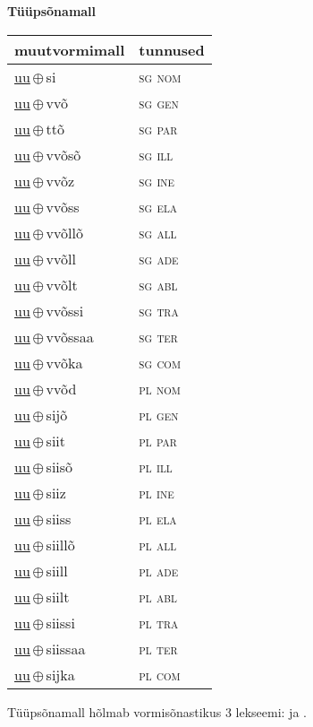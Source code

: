 

\vspace{3.5em}
\noindent \begin{minipage}{\textwidth}
\noindent \textbf{Tüüpsõnamall \,}\\

\begin{sideways}
\begin{tabular}{l l}
muutvormimall & tunnused \\
\hline
\underline{uu}\,$\oplus$\,si & \textsc{ sg nom } \\
\underline{uu}\,$\oplus$\,vvõ & \textsc{ sg gen } \\
\underline{uu}\,$\oplus$\,ttõ & \textsc{ sg par } \\
\underline{uu}\,$\oplus$\,vvõsõ & \textsc{ sg ill } \\
\underline{uu}\,$\oplus$\,vvõz & \textsc{ sg ine } \\
\underline{uu}\,$\oplus$\,vvõss & \textsc{ sg ela } \\
\underline{uu}\,$\oplus$\,vvõllõ & \textsc{ sg all } \\
\underline{uu}\,$\oplus$\,vvõll & \textsc{ sg ade } \\
\underline{uu}\,$\oplus$\,vvõlt & \textsc{ sg abl } \\
\underline{uu}\,$\oplus$\,vvõssi & \textsc{ sg tra } \\
\underline{uu}\,$\oplus$\,vvõssaa & \textsc{ sg ter } \\
\underline{uu}\,$\oplus$\,vvõka & \textsc{ sg com } \\
\underline{uu}\,$\oplus$\,vvõd & \textsc{ pl nom } \\
\underline{uu}\,$\oplus$\,sijõ & \textsc{ pl gen } \\
\underline{uu}\,$\oplus$\,siit & \textsc{ pl par } \\
\underline{uu}\,$\oplus$\,siisõ & \textsc{ pl ill } \\
\underline{uu}\,$\oplus$\,siiz & \textsc{ pl ine } \\
\underline{uu}\,$\oplus$\,siiss & \textsc{ pl ela } \\
\underline{uu}\,$\oplus$\,siillõ & \textsc{ pl all } \\
\underline{uu}\,$\oplus$\,siill & \textsc{ pl ade } \\
\underline{uu}\,$\oplus$\,siilt & \textsc{ pl abl } \\
\underline{uu}\,$\oplus$\,siissi & \textsc{ pl tra } \\
\underline{uu}\,$\oplus$\,siissaa & \textsc{ pl ter } \\
\underline{uu}\,$\oplus$\,sijka & \textsc{ pl com } \\
\end{tabular}
\end{sideways}
\label{tab:tüüpsõnamall-uusi}

\end{minipage}

 
\vspace{1em}
\noindent Tüüpsõnamall  hõlmab vormisõnastikus 3 lekseemi:  ja .
